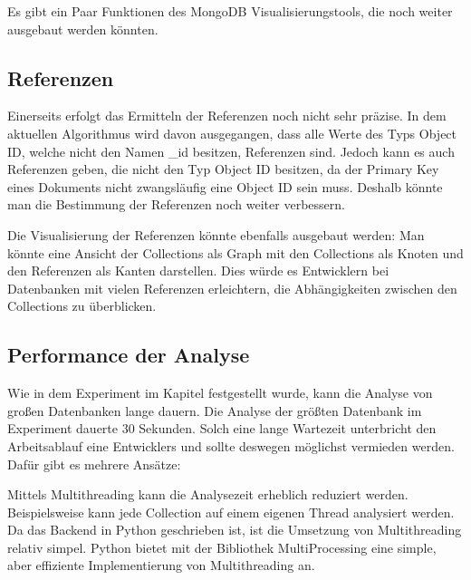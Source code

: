 \iffalse
Im Ausblick werden Ideen für die Weiterentwicklung der erstellten Lösung 
aufgezeigt. Der Ausblick sollte daher zeigen, dass die Ergebnisse der 
Arbeit nicht nur für die in der Arbeit identifizierten Problemstellungen 
verwendbar sind, sondern darüber hinaus erweitert sowie auf andere 
Probleme übertragen werden können.
\fi

Es gibt ein Paar Funktionen des MongoDB Visualisierungstools, die noch weiter ausgebaut werden könnten.

\subsection{Referenzen}
\label{sub:ausblick_referenzen}

Einerseits erfolgt das Ermitteln der Referenzen noch nicht sehr präzise.
In dem aktuellen Algorithmus wird davon ausgegangen, dass alle Werte des Typs Object ID, welche nicht den Namen \_id besitzen, Referenzen sind.
Jedoch kann es auch Referenzen geben, die nicht den Typ Object ID besitzen, da der Primary Key eines Dokuments nicht zwangsläufig eine Object ID sein muss.
Deshalb könnte man die Bestimmung der Referenzen noch weiter verbessern.

Die Visualisierung der Referenzen könnte ebenfalls ausgebaut werden:
Man könnte eine Ansicht der Collections als Graph mit den Collections als Knoten und den Referenzen als Kanten darstellen.
Dies würde es Entwicklern bei Datenbanken mit vielen Referenzen erleichtern, die Abhängigkeiten zwischen den Collections zu überblicken.

\subsection{Performance der Analyse}
\label{sub:ausblick_performance}

Wie in dem Experiment im Kapitel  festgestellt wurde, kann die Analyse von großen Datenbanken lange dauern.
Die Analyse der größten Datenbank im Experiment dauerte 30 Sekunden.
Solch eine lange Wartezeit unterbricht den Arbeitsablauf eine Entwicklers und sollte deswegen möglichst vermieden werden.
Dafür gibt es mehrere Ansätze:

Mittels Multithreading kann die Analysezeit erheblich reduziert werden.
Beispielsweise kann jede Collection auf einem eigenen Thread analysiert werden.
Da das Backend in Python geschrieben ist, ist die Umsetzung von Multithreading relativ simpel.
Python bietet mit der Bibliothek MultiProcessing eine simple, aber effiziente Implementierung von Multithreading an.
~\autocite{python:multiprocessing}


